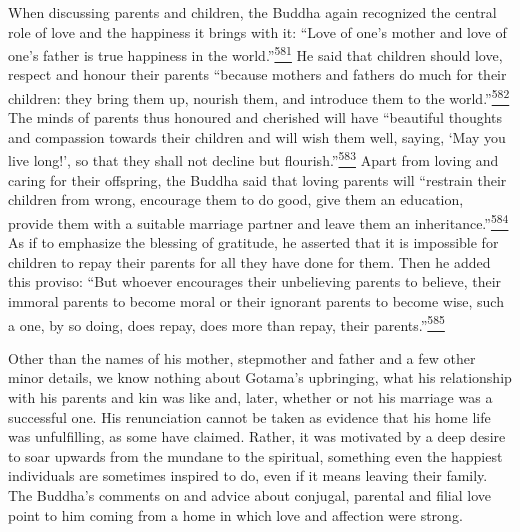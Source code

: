When discussing parents and children, the Buddha again recognized the
central role of love and the happiness it brings with it: ``Love of
one's mother and love of one's father is true happiness in the
world.''\label{footprints_split_015.html_fnref581}\hyperref[footprints_split_025.htmlux5cux23fn581]{\textsuperscript{581}}
He said that children should love, respect and honour their parents
``because mothers and fathers do much for their children: they bring
them up, nourish them, and introduce them to the
world.''\label{footprints_split_015.html_fnref582}\hyperref[footprints_split_025.htmlux5cux23fn582]{\textsuperscript{582}}
The minds of parents thus honoured and cherished will have ``beautiful
thoughts and compassion towards their children and will wish them well,
saying, `May you live long!', so that they shall not decline but
flourish.''\label{footprints_split_015.html_fnref583}\hyperref[footprints_split_025.htmlux5cux23fn583]{\textsuperscript{583}}
Apart from loving and caring for their offspring, the Buddha said that
loving parents will ``restrain their children from wrong, encourage them
to do good, give them an education, provide them with a suitable
marriage partner and leave them an
inheritance.''\label{footprints_split_015.html_fnref584}\hyperref[footprints_split_025.htmlux5cux23fn584]{\textsuperscript{584}}
As if to emphasize the blessing of gratitude, he asserted that it is
impossible for children to repay their parents for all they have done
for them. Then he added this proviso: ``But whoever encourages their
unbelieving parents to believe, their immoral parents to become moral or
their ignorant parents to become wise, such a one, by so doing, does
repay, does more than repay, their
parents.''\label{footprints_split_015.html_fnref585}\hyperref[footprints_split_025.htmlux5cux23fn585]{\textsuperscript{585}}

Other than the names of his mother, stepmother and father and a few
other minor details, we know nothing about Gotama's upbringing, what his
relationship with his parents and kin was like and, later, whether or
not his marriage was a successful one. His renunciation cannot be taken
as evidence that his home life was unfulfilling, as some have claimed.
Rather, it was motivated by a deep desire to soar upwards from the
mundane to the spiritual, something even the happiest individuals are
sometimes inspired to do, even if it means leaving their family. The
Buddha's comments on and advice about conjugal, parental and filial love
point to him coming from a home in which love and affection were strong.

